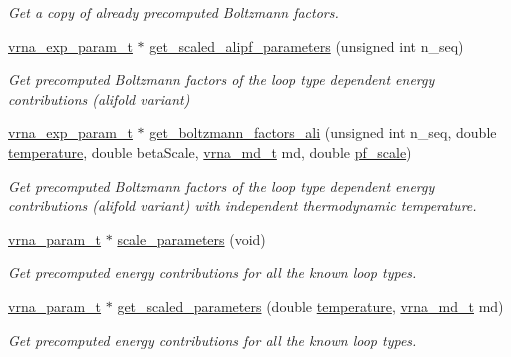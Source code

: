 \begin{DoxyCompactItemize}
\begin{DoxyCompactList}\small\item\em Get a copy of already precomputed Boltzmann factors. \end{DoxyCompactList}\item 
\hyperlink{group__energy__parameters_ga01d8b92fe734df8d79a6169482c7d8d8}{vrna\+\_\+exp\+\_\+param\+\_\+t} $\ast$ \hyperlink{group__energy__parameters_ga0ccf4e1be085a573533fd6b9da2d8cf9}{get\+\_\+scaled\+\_\+alipf\+\_\+parameters} (unsigned int n\+\_\+seq)
\begin{DoxyCompactList}\small\item\em Get precomputed Boltzmann factors of the loop type dependent energy contributions (alifold variant) \end{DoxyCompactList}\item 
\hyperlink{group__energy__parameters_ga01d8b92fe734df8d79a6169482c7d8d8}{vrna\+\_\+exp\+\_\+param\+\_\+t} $\ast$ \hyperlink{group__energy__parameters_ga2aa1d87c97f35d2e4121634a17556829}{get\+\_\+boltzmann\+\_\+factors\+\_\+ali} (unsigned int n\+\_\+seq, double \hyperlink{group__model__details_gab4b11c8d9c758430960896bc3fe82ead}{temperature}, double beta\+Scale, \hyperlink{group__model__details_ga1f8a10e12a0a1915f2a4eff0b28ea17c}{vrna\+\_\+md\+\_\+t} md, double \hyperlink{group__model__details_gad3b22044065acc6dee0af68931b52cfd}{pf\+\_\+scale})
\begin{DoxyCompactList}\small\item\em Get precomputed Boltzmann factors of the loop type dependent energy contributions (alifold variant) with independent thermodynamic temperature. \end{DoxyCompactList}\item 
\hyperlink{group__energy__parameters_ga8a69ca7d787e4fd6079914f5343a1f35}{vrna\+\_\+param\+\_\+t} $\ast$ \hyperlink{group__energy__parameters_ga541f2cf7436e9bc939b0a49b24baf987}{scale\+\_\+parameters} (void)
\begin{DoxyCompactList}\small\item\em Get precomputed energy contributions for all the known loop types. \end{DoxyCompactList}\item 
\hyperlink{group__energy__parameters_ga8a69ca7d787e4fd6079914f5343a1f35}{vrna\+\_\+param\+\_\+t} $\ast$ \hyperlink{group__energy__parameters_ga7fa6a000d7c16feab939f2c4ee626197}{get\+\_\+scaled\+\_\+parameters} (double \hyperlink{group__model__details_gab4b11c8d9c758430960896bc3fe82ead}{temperature}, \hyperlink{group__model__details_ga1f8a10e12a0a1915f2a4eff0b28ea17c}{vrna\+\_\+md\+\_\+t} md)
\begin{DoxyCompactList}\small\item\em Get precomputed energy contributions for all the known loop types. \end{DoxyCompactList}\end{DoxyCompactItemize}


